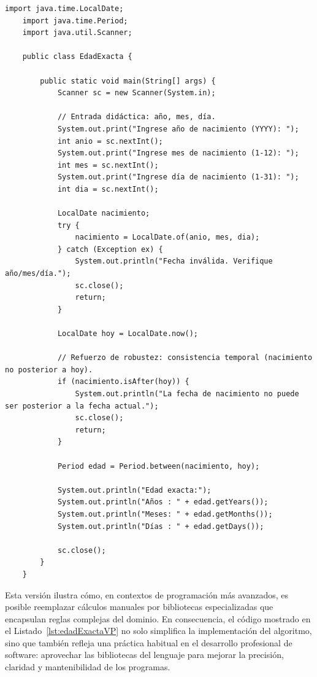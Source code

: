 \documentclass[12pt,twoside]{book}
\begin{document}
					\begin{lstlisting}[style=Java,caption={Resolución de una ecuación cuadrática},label={lst:edadExactaVP}]
	import java.time.LocalDate;
	import java.time.Period;
	import java.util.Scanner;
	
	public class EdadExacta {
		
		public static void main(String[] args) {
			Scanner sc = new Scanner(System.in);
			
			// Entrada didáctica: año, mes, día.
			System.out.print("Ingrese año de nacimiento (YYYY): ");
			int anio = sc.nextInt();
			System.out.print("Ingrese mes de nacimiento (1-12): ");
			int mes = sc.nextInt();
			System.out.print("Ingrese día de nacimiento (1-31): ");
			int dia = sc.nextInt();
			
			LocalDate nacimiento;
			try {
				nacimiento = LocalDate.of(anio, mes, dia);
			} catch (Exception ex) {
				System.out.println("Fecha inválida. Verifique año/mes/día.");
				sc.close();
				return;
			}
			
			LocalDate hoy = LocalDate.now();
			
			// Refuerzo de robustez: consistencia temporal (nacimiento no posterior a hoy).
			if (nacimiento.isAfter(hoy)) {
				System.out.println("La fecha de nacimiento no puede ser posterior a la fecha actual.");
				sc.close();
				return;
			}
			
			Period edad = Period.between(nacimiento, hoy);
			
			System.out.println("Edad exacta:");
			System.out.println("Años : " + edad.getYears());
			System.out.println("Meses: " + edad.getMonths());
			System.out.println("Días : " + edad.getDays());
			
			sc.close();
		}
	} \end{lstlisting}
					
					\noindent
					 Esta versión ilustra cómo, en contextos de programación más avanzados, es posible reemplazar cálculos manuales por bibliotecas especializadas que encapsulan reglas complejas del dominio. En consecuencia, el código mostrado en el Listado~\ref{lst:edadExactaVP} no solo simplifica la implementación del algoritmo, sino que también refleja una práctica habitual en el desarrollo profesional de software: aprovechar las bibliotecas del lenguaje para mejorar la precisión, claridad y mantenibilidad de los programas.
				
\end{document}
